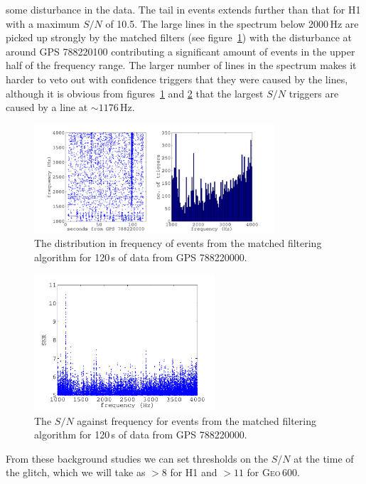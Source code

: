 some disturbance in the data. The tail in events extends further than that for H1 with a maximum
$S/N$ of 10.5. The large lines in the spectrum below 2000\,Hz are picked up strongly by the matched
filters (see figure~\ref{GEORingdownBgFreq}) with the disturbance at around GPS 788220100
contributing a significant amount of events in the upper half of the frequency range. The larger
number of lines in the spectrum makes it harder to veto out with confidence triggers that they were
caused by the lines, although it is obvious from figures~\ref{GEORingdownBgFreq} and
\ref{GEORingdownBgSNRVsFreq} that the largest $S/N$ triggers are caused  by a line at $\sim
1176$\,Hz.
\begin{figure}[!htbp]
\begin{center}
\includegraphics[width=0.8\textwidth]{figs/GEORingdownBgFreq}\caption{The distribution in frequency
of events from the matched filtering algorithm for 120\,s of \geo data from GPS
788220000.}\label{GEORingdownBgFreq}
\end{center}
\end{figure}
\begin{figure}[!htbp]
\begin{center}
\includegraphics[width=0.6\textwidth]{figs/GEORingdownBgSNRVsFreq}\caption{The $S/N$ against
frequency for events from the matched filtering algorithm for 120\,s of \geo data from GPS
788220000.}\label{GEORingdownBgSNRVsFreq}
\end{center}
\end{figure}
From these background studies we can set thresholds on the $S/N$ at the time of the glitch, which we
will take as $> 8$ for H1 and $> 11$ for G\textsc{eo}\,600. 


